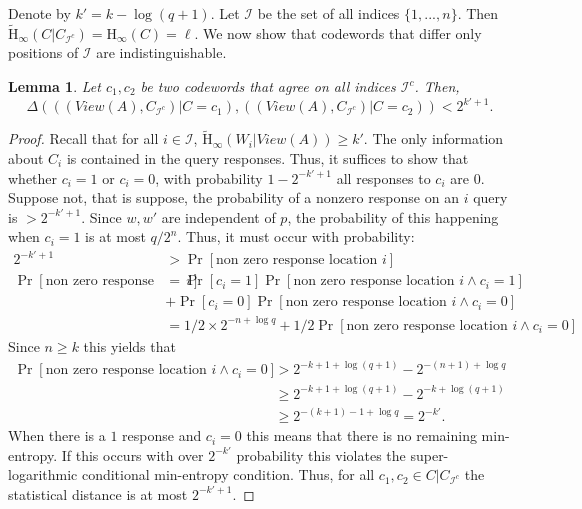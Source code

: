 \documentclass[11pt]{article}
\newcommand{\Hoo}{\mathrm{H}_\infty}
\newcommand{\Hav}{\tilde{\mathrm{H}}_\infty}
\newtheorem{lemma}[theorem]{Lemma}
\begin{document}
Denote by $k' = k - \log (q+1)$.
Let $\mathcal{I}$ be the set of all indices $\{1,..., n\}$.  Then $\Hav(C | C_{\mathcal{I}^c}) = \Hoo(C) = \ell$.  We now show that codewords that differ only positions of $\mathcal{I}$ are indistinguishable.
\begin{lemma}
\label{lem:codewords in I close}
Let $c_1, c_2$ be two codewords that agree on all indices $\mathcal{I}^c$.  Then, 
\[
\Delta( ((View(A), C_{\mathcal{I}^c} )| C = c_1),( (View(A), C_{\mathcal{I}^c})  | C= c_2)) < 2^{k'+1}.
\]
\end{lemma}
\begin{proof}
Recall that for all $i\in \mathcal{I}$, $\Hav(W_i | View(A))\geq k'$.  The only information about $C_i$ is contained in the query responses.  Thus, it suffices to show that whether $c_i= 1$ or $c_i=0$, with probability $1-2^{-k'+1}$ all responses to $c_i$ are $0$.  Suppose not, that is suppose, the probability of a nonzero response on an $i$ query is $>2^{-k'+1}$.  Since $w, w'$ are independent of $p$, the probability of this happening when $c_i = 1$ is at most $q/2^n$.  Thus, it must occur with probability:
\begin{align*}
2^{-k'+1}&>\Pr[\text{non zero response location }i]\\
\Pr[\text{non zero response location }i] &= \Pr[c_i =1]\Pr[\text{non zero response location }i\wedge c_i=1] \\&+ \Pr[c_i=0] \Pr[\text{non zero response location }i \wedge c_i=0]\\
&=1/2 \times 2^{-n+\log q} + 1/2 \Pr[\text{non zero response location }i \wedge c_i=0]
\end{align*}
Since $n\geq k$ this yields that 
\begin{align*}
 \Pr[\text{non zero response location }i \wedge c_i=0] &> 2^{-k+1+\log (q+1)} - 2^{-(n+1) +\log q} \\
 &\geq 2^{-k+1+\log (q+1)} - 2^{-k +\log (q+1)} \\
 &\geq 2^{-(k+1) -1+ \log q} = 2^{-k'}.
 \end{align*}
 When there is a $1$ response and $c_i=0$ this means that there is no remaining min-entropy.  If this occurs with over $2^{-k'}$ probability this violates the super-logarithmic conditional min-entropy condition.  Thus, for all $c_1, c_2\in C| C_{\mathcal{I}^c}$ the statistical distance is at most $2^{-k'+1}$.
\end{proof}
\end{document}
